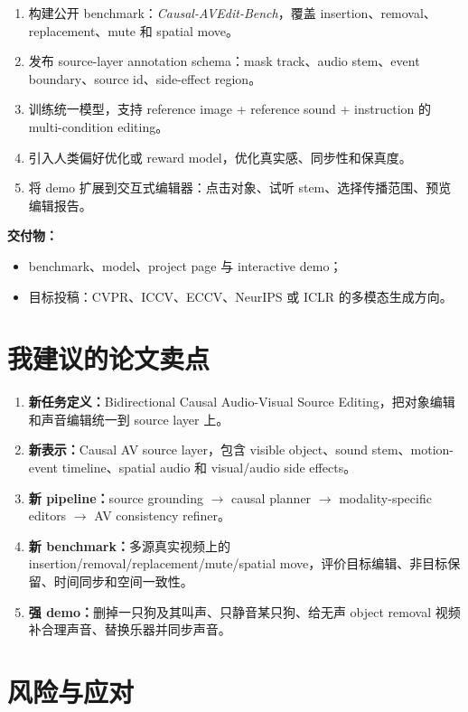 \begin{enumerate}[leftmargin=2em]
  \item 构建公开 benchmark：\textit{Causal-AVEdit-Bench}，覆盖 insertion、removal、replacement、mute 和 spatial move。
  \item 发布 source-layer annotation schema：mask track、audio stem、event boundary、source id、side-effect region。
  \item 训练统一模型，支持 reference image + reference sound + instruction 的 multi-condition editing。
  \item 引入人类偏好优化或 reward model，优化真实感、同步性和保真度。
  \item 将 demo 扩展到交互式编辑器：点击对象、试听 stem、选择传播范围、预览编辑报告。
\end{enumerate}

\textbf{交付物：}
\begin{itemize}[leftmargin=2em]
  \item benchmark、model、project page 与 interactive demo；
  \item 目标投稿：CVPR、ICCV、ECCV、NeurIPS 或 ICLR 的多模态生成方向。
\end{itemize}

\section{我建议的论文卖点}

\begin{enumerate}[leftmargin=2em]
  \item \textbf{新任务定义：}Bidirectional Causal Audio-Visual Source Editing，把对象编辑和声音编辑统一到 source layer 上。
  \item \textbf{新表示：}Causal AV source layer，包含 visible object、sound stem、motion-event timeline、spatial audio 和 visual/audio side effects。
  \item \textbf{新 pipeline：}source grounding $\rightarrow$ causal planner $\rightarrow$ modality-specific editors $\rightarrow$ AV consistency refiner。
  \item \textbf{新 benchmark：}多源真实视频上的 insertion/removal/replacement/mute/spatial move，评价目标编辑、非目标保留、时间同步和空间一致性。
  \item \textbf{强 demo：}删掉一只狗及其叫声、只静音某只狗、给无声 object removal 视频补合理声音、替换乐器并同步声音。
\end{enumerate}

\section{风险与应对}

